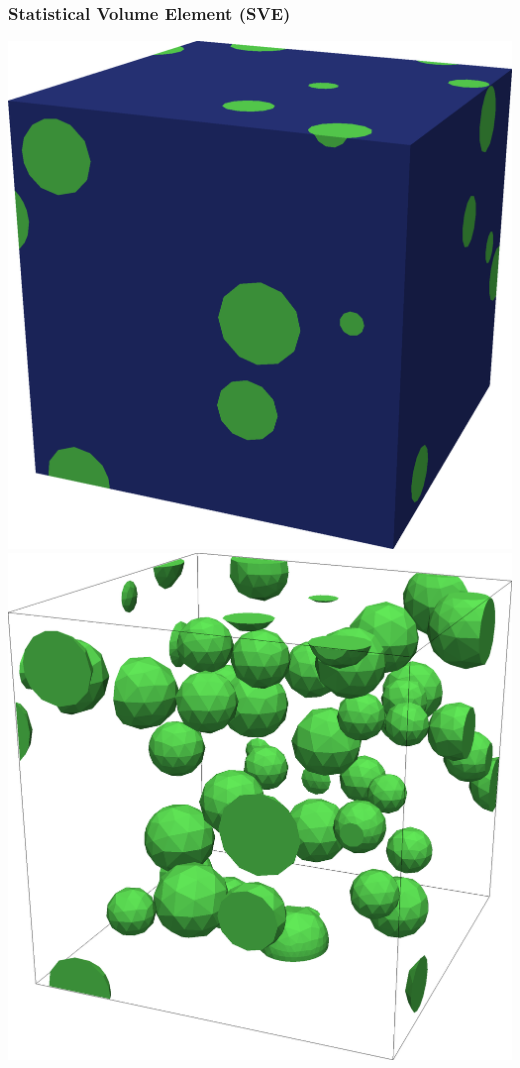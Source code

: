 \documentclass[11pt]{beamer} %
\begin{document}
\begin{frame}
 \frametitle{Statistical Volume Element (SVE)}
\begin{center}
 \hspace{1cm}
 \includegraphics[scale=0.05]{figures/rve6.png}
 \includegraphics[scale=0.05]{figures/rve6_inc.png}

\end{center}
\end{frame}
\end{document}
